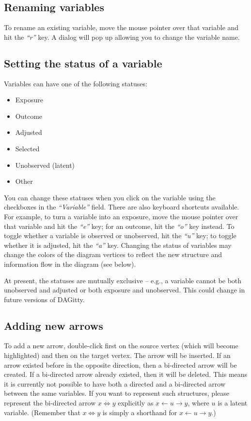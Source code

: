 \documentclass[a4paper]{article} %
\newcommand{\pp}{DAGitty\xspace}
\newcommand{\action}[1]{\emph{``#1''}}
\begin{document}
\subsection{Renaming variables}

To rename an existing variable, move the
mouse pointer over that variable and hit the \action{r} key. A dialog
will pop up allowing you to change the variable name.

\subsection{Setting the status of a variable}

Variables can have one of the following 
statuses:

\begin{itemize} 
\item Exposure
\item Outcome
\item Adjusted
\item Selected
\item Unobserved (latent)
\item Other
\end{itemize}

You can change these statuses when you click on the variable 
using the checkboxes in the \action{Variable} field.
There are also keyboard shortcuts available.
For example, to turn a variable into an exposure, move the
mouse pointer over that variable and hit the \action{e} key; 
for an outcome, hit the \action{o} key instead.
To toggle whether a variable is observed or unobserved,
hit the \action{u} key; to toggle whether it is 
adjusted, hit the \action{a} key.
Changing the status of variables may change the 
colors of the diagram vertices to reflect the new structure 
and information flow in the diagram (see below). 

At present, the statuses are mutually exclusive --  e.g.,
a variable cannot be both unobserved and adjusted 
or both exposure and unobserved. This could change
in future versions of \pp.

\subsection{Adding new arrows}

To add a new arrow, double-click first on the source vertex 
(which will become highlighted) and then on the target vertex.
The arrow will be inserted. If an arrow existed before
in the opposite direction, then a bi-directed arrow will be created.
If a bi-directed arrow already existed, then it will be deleted.
This means it is currently not possible to have both a directed
 and a bi-directed arrow between the same variables. If you want to represent
such structures, please represent the bi-directed arrow 
$x \Leftrightarrow y$ explicitly as $x \leftarrow u \rightarrow y$, 
where $u$ is a latent variable. (Remember that $x \Leftrightarrow y$
is simply a shorthand for $x \leftarrow u \rightarrow y$.)
\end{document}
